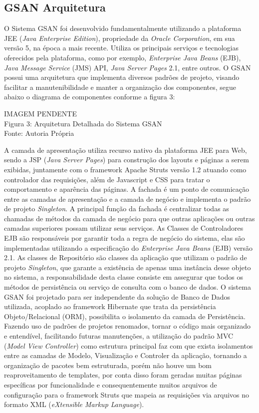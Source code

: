 \subsection{GSAN Arquitetura}
	
O Sistema GSAN foi desenvolvido fundamentalmente utilizando a plataforma JEE (\textit{Java Enterprise Edition}), propriedade da \textit{Oracle Corporation}, em sua versão 5, na época a mais recente. Utiliza os principais serviços e tecnologias oferecidos pela plataforma, como por exemplo, \textit{Enterprise Java Beans} (EJB), \textit{Java Message Service} (JMS) API, \textit{Java Server Pages} 2.1, entre outros.
O GSAN possui uma arquitetura que implementa diversos padrões de projeto, visando facilitar a manutenibilidade e manter a organização dos componentes, segue abaixo o diagrama de componentes conforme a figura 3:

\begin{center}
	IMAGEM PENDENTE \\
	Figura 3: Arquitetura Detalhada do Sistema GSAN \\
	Fonte: Autoria Própria	
\end{center}

	
A camada de apresentação utiliza recurso nativo da plataforma JEE para Web, sendo a JSP (\textit{Java Server Pages}) para construção dos layouts e páginas a serem exibidas, juntamente com o framework Apache Struts versão 1.2 atuando como controlador das requisições, além de Javascript e CSS para tratar o comportamento e aparência das páginas.
A fachada é um ponto de comunicação entre as camadas de apresentação e a camada de negócio e implementa o padrão de projeto \textit{Singleton}. A principal função da fachada é centralizar todas as chamadas de métodos da camada de negócio para que outras aplicações ou outras camadas superiores possam utilizar seus serviços.
As Classes de Controladores EJB são responsáveis por garantir toda a regra de negócio do sistema, elas são implementadas utilizando a especificação do \textit{Enterprise Java Beans} (EJB) versão 2.1.
As classes de Repositório são classes da aplicação que utilizam o padrão de projeto \textit{Singleton}, que garante a existência de apenas uma instância desse objeto no sistema, a responsabilidade desta classe consiste em assegurar que todos os métodos de persistência ou serviço de consulta com o banco de dados.
O sistema GSAN foi projetado para ser independente da solução de Banco de Dados utilizada, acoplado ao framework Hibernate que trata da persistência Objeto/Relacional (ORM), possibilita o isolamento da camada de Persistência. Fazendo uso de padrões de projetos renomados, tornar o código mais organizado e entendível, facilitando futuras manutenções, a utilização do padrão MVC (\textit{Model View Controller}) como estrutura principal faz com que exista isolamentos entre as camadas de Modelo, Visualização e Controler da aplicação, tornando a organização de pacotes bem estruturada, porém  não houve um bom reaproveitamento de templates, por conta disso foram geradas muitas páginas específicas por funcionalidade e consequentemente muitos arquivos de configuração para o framework Struts  que mapeia as requisições via arquivos no formato XML (\textit{eXtensible Markup Language}).
	
